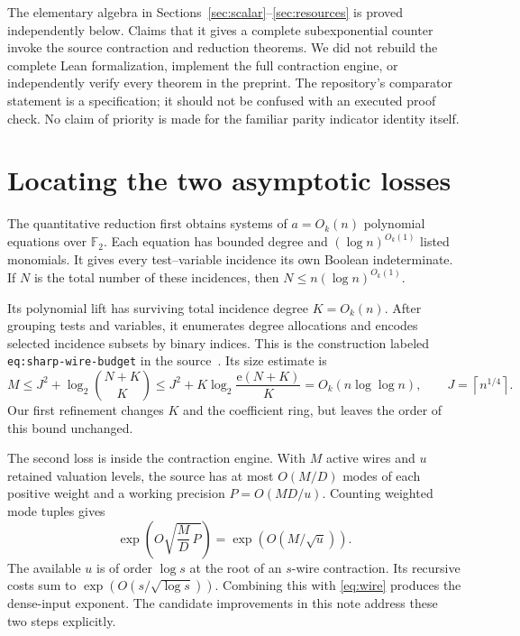 \documentclass[11pt]{article}
\theoremstyle{definition}
\theoremstyle{remark}
\newcommand{\F}{\mathbb F}
\newcommand{\ceil}[1]{\left\lceil #1\right\rceil}
\begin{document}
The elementary algebra in Sections~\ref{sec:scalar}--\ref{sec:resources} is
proved independently below. Claims that it gives a complete subexponential
counter invoke the source contraction and reduction theorems. We did not
rebuild the complete Lean formalization, implement the full contraction
engine, or independently verify every theorem in the preprint. The repository's
comparator statement is a specification; it should not be confused with an
executed proof check. No claim of priority is made for the familiar parity
indicator identity itself.

\section{Locating the two asymptotic losses}\label{sec:bottlenecks}

The quantitative reduction first obtains systems of $a=O_k(n)$ polynomial
equations over $\F_2$. Each equation has bounded degree and
$(\log n)^{O_k(1)}$ listed monomials. It gives every test--variable incidence
its own Boolean indeterminate. If $N$ is the total number of these incidences,
then $N\le n(\log n)^{O_k(1)}$.

Its polynomial lift has surviving total incidence degree $K=O_k(n)$. After
grouping tests and variables, it enumerates degree allocations and encodes
selected incidence subsets by binary indices. This is the construction labeled
\texttt{eq:sharp-wire-budget} in the source~\cite{reduction}. Its size estimate is
\begin{equation}\label{eq:wire}
 M\le J^2+\log_2\binom{N+K}{K}
 \le J^2+K\log_2\!\frac{\mathrm e(N+K)}{K}
 =O_k(n\log\log n),\qquad J=\ceil{n^{1/4}}.
\end{equation}
Our first refinement changes $K$ and the coefficient ring, but leaves the order
of this bound unchanged.

The second loss is inside the contraction engine. With $M$ active wires and
$u$ retained valuation levels, the source has at most $O(M/D)$ modes of each
positive weight and a working precision $P=O(MD/u)$. Counting weighted mode
tuples gives
\begin{equation}\label{eq:partition-source}
 \exp\!\left(O\!\sqrt{\frac MD\,P}\right)
 =\exp(O(M/\sqrt u)).
\end{equation}
The available $u$ is of order $\log s$ at the root of an $s$-wire contraction.
Its recursive costs sum to $\exp(O(s/\sqrt{\log s}))$. Combining this with
\eqref{eq:wire} produces the dense-input exponent. The candidate improvements
in this note address these two steps explicitly.
\end{document}
